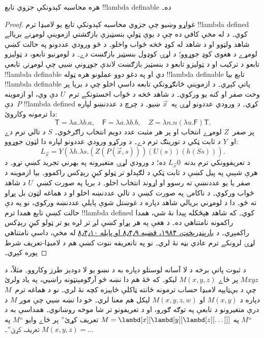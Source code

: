 \documentclass[../../../include/open-logic-section]{subfiles}
\begin{document}

\begin{thm}
هره محاسبه کېدونکې جزوي تابع !!{lambda definable} ده۔
\end{thm}

\begin{proof}
غواړو وښيو چې جزوي محاسبه کېدونکې تابع يو لامبډا ترم !!{lambda defined} کوي۔ د  له مخې کافي ده چې د يوې ټولې بنسټيزې بازګشتي ازموينې لومړنے بريالے شاهد ولټوو او د شاهد له کوډ څخه ځواب واخلو۔ د څو ورودي عددونو په حالت کښې لومړے د هغوی کوډ جوړوو؛ د لړۍ کوډول بنسټيز بازګښت دے۔ د لومړنيو تابعو، د ټوليزو تابعو د ترکيب او د ټوليزو تابعو د بنسټيز بازګښت لاندې جوړونې ښيي چې لومړنۍ تابعې !!{lambda definable} دي او په دغو دوو عملونو هره ټوله !!{lambda definable} تابع بيا !!{lambda definable} پاتې کېږي۔ د ازموينې ځانګړونکې تابعه داسې اخلو چې د بريا پر وخت صفر او کنه يو ورکوي۔ د شاهد څخه د ځواب اخستونکے ترم~$U$ دې وي، او ازموينه دې~$P$ !!{lambda defined} کړي۔ د ورودي عددونو لړۍ په~$\vec x$ ښيو۔
د چرچ د عددنښو لپاره دا ترمونه وکاروئ:
\[
\mathsf{T}=\lambda a.\lambda b.a,\quad\mathsf{F}=\lambda a.\lambda b.b,\quad Z=\lambda n.n(\lambda u.\mathsf{F})\mathsf{T}.
\]
پر صفر~$Z$ لومړے انتخاب او پر هر مثبت عدد دويم انتخاب راګرځوي۔ $S$ د تالي ترم دے او~$Y$ د ثابت ټکي د تورينګ ترم دے۔ د ورکړو ورودي عددونو لپاره دا لټون جوړوو:
\[
L_{\vec x}=Y(\lambda h.\lambda s.(Z(P(\vec x,s)))(U(s))(h(Ss))).
\]
د تعريفوونکي ترم بدنه~$L_{\vec x}\num{0}$ ده؛ د ورودي لړۍ متغيرونه په بهرني تجريد کښې تړو۔ د هرې شېبې په پيل کښې د ثابت ټکي د لګېدلو تر ټولو کيڼ رېډکس راکموو۔ بيا ازموينه د صفر يا يو عددنښې ته رسوو او اړوند انتخاب اخلو۔ د بريا په صورت کښې~$U$ د شاهد ځواب ورکوي۔ د ناکامۍ په صورت کښې د تالي عددنښه اخلو او د هماغه لټون بل پړاو ته ځو۔ دا د لومړني بريالي شاهد دپاره د غوښتل شوې پايلې عددنښه ورکوي، نو په دې حالت کښې تابع همدا ترم !!{lambda defined} کوي۔
که شاهد هېڅکله پيدا نۀ شي، همدا راکمونه نامتناهي ده۔ د هغې په هر پړاو کښې لږ تر لږه يو تر ټولو کيڼ رېډکس راکمېږي۔ د \href{https://pages.jh.edu/rrynasi1/FoundationsOFMath/Literature/LambdaCalculus/Barendregt1984TheLambdaCalculus.ItsSyntax+Semantics.RevisedEdition.pdf}{بارېنډرېخټ، ۱۹۸۴، قضيه ۸٫۴٫۹ او پايله ۸٫۴٫۱۰} له مخې، داسې نامتناهي لړۍ لرونکے ترم عادي بڼه نۀ لري۔ نو په ناتعريفه ننوت کښې هم د لامبډا-تعريف شرط پوره کېږي۔
\end{proof}

د ثبوت پاتې برخه د لا آسانه لوستلو دپاره به د نښو يو لا دوديز
طرز وکاروو۔ مثلاً، د $Mxyz$ پر ځاے $M(x, y, z)$ ليکو۔ که څۀ هم دا
نښه څو آرګومېنټونه راښيي، په ياد ولرئ چې د بې‌ټايپه لامبډا حساب
ترمونه ځانته ټاکلې ځاييزه کچه نۀ لري۔ نو د هماغه ترم~$M$ دپاره د
$M(x,y)$ او $M(x,y,z,w)$ ليکل هم معنا لري۔ خو دا نښه ښيي چې موږ
$M$ د درې متغيرونو د تابعې په توګه ګورو، او د تعريفونو تر شا موخه
روښانوي۔ همداسې به د ``$M$ په $M =
\lambd[x][\lambd[y][\lambd[z][\dots]]]$ تعريف کړئ'' پر ځاے
وايو ``$M$ په $M(x,y,z) = \dots$ تعريف کړئ''۔
\end{document}
